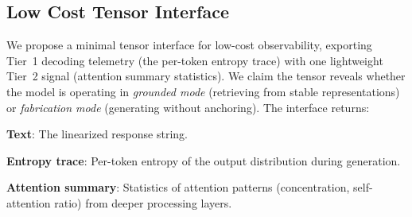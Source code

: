 \subsection{Low Cost Tensor Interface}

We propose a minimal tensor interface for low-cost observability,
exporting Tier~1 decoding telemetry (the per-token entropy trace) with one
lightweight Tier~2 signal (attention summary statistics). We claim the tensor
reveals whether the model is operating in \emph{grounded mode} (retrieving from
stable representations) or \emph{fabrication mode} (generating without
anchoring). The interface returns:
\begin{enumerate*}[label=(\roman*)]
\item \textbf{Text}: The linearized response string.
\item \textbf{Entropy trace}: Per-token entropy of the output distribution during
  generation.
\item \textbf{Attention summary}: Statistics of attention patterns (concentration,
  self-attention ratio) from deeper processing layers.
\end{enumerate*}





